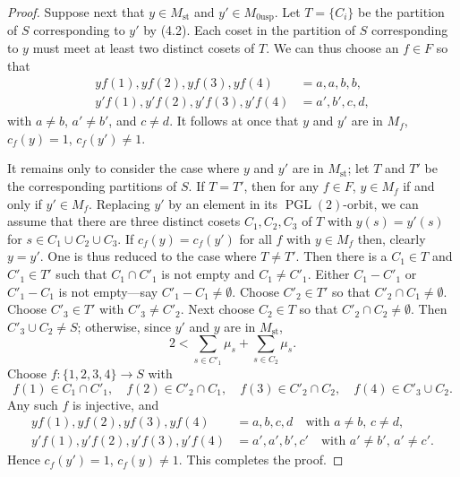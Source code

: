 \documentclass[12pt,a4paper]{article}
\theoremstyle{plain}
\theoremstyle{definition}
\theoremstyle{remark}
\DeclareMathOperator{\PGL}{PGL}
\numberwithin{equation}{section}
\providecommand{\PGL}{\operatorname{PGL}}
\begin{document}
\begin{proof}
Suppose next that $y \in M_{\mathrm{st}}$ and $y' \in M_{0\mathrm{usp}}$. Let $T = \{C_i\}$ be the partition of $S$ corresponding to $y'$ by (4.2). Each coset in the partition of $S$ corresponding to $y$ must meet at least two distinct cosets of $T$. We can thus choose an $f \in F$ so that
\begin{align*}
yf(1), yf(2), yf(3), yf(4) &= a, a, b, b, \\
y'f(1), y'f(2), y'f(3), y'f(4) &= a', b', c, d,
\end{align*}
with $a \neq b$, $a' \neq b'$, and $c \neq d$. It follows at once that $y$ and $y'$ are in $M_f$, $c_f(y) = 1$, $c_f(y') \neq 1$.

It remains only to consider the case where $y$ and $y'$ are in $M_{\mathrm{st}}$; let $T$ and $T'$ be the corresponding partitions of $S$. If $T = T'$, then for any $f \in F$, $y \in M_f$ if and only if $y' \in M_f$. Replacing $y'$ by an element in its $\PGL(2)$-orbit, we can assume that there are three distinct cosets $C_1, C_2, C_3$ of $T$ with $y(s) = y'(s)$ for $s \in C_1 \cup C_2 \cup C_3$. If $c_f(y) = c_f(y')$ for all $f$ with $y \in M_f$ then, clearly $y = y'$. One is thus reduced to the case where $T \neq T'$. Then there is a $C_1 \in T$ and $C'_1 \in T'$ such that $C_1 \cap C'_1$ is not empty and $C_1 \neq C'_1$. Either $C_1 - C'_1$ or $C'_1 - C_1$ is not empty---say $C'_1 - C_1 \neq \emptyset$. Choose $C'_2 \in T'$ so that $C'_2 \cap C_1 \neq \emptyset$. Choose $C'_3 \in T'$ with $C'_3 \neq C'_2$. Next choose $C_2 \in T$ so that $C'_2 \cap C_2 \neq \emptyset$. Then $C'_3 \cup C_2 \neq S$; otherwise, since $y'$ and $y$ are in $M_{\mathrm{st}}$,
\[
2 < \sum_{s \in C'_1} \mu_s + \sum_{s \in C_2} \mu_s.
\]
Choose $f: \{1, 2, 3, 4\} \to S$ with
\[
f(1) \in C_1 \cap C'_1, \quad f(2) \in C'_2 \cap C_1, \quad f(3) \in C'_2 \cap C_2, \quad f(4) \in C'_3 \cup C_2.
\]
Any such $f$ is injective, and
\begin{align*}
yf(1), yf(2), yf(3), yf(4) &= a, b, c, d \quad \text{with } a \neq b, \, c \neq d, \\
y'f(1), y'f(2), y'f(3), y'f(4) &= a', a', b', c' \quad \text{with } a' \neq b', \, a' \neq c'.
\end{align*}
Hence $c_f(y') = 1$, $c_f(y) \neq 1$. This completes the proof.
\end{proof}

\subsection{}
\end{document}
